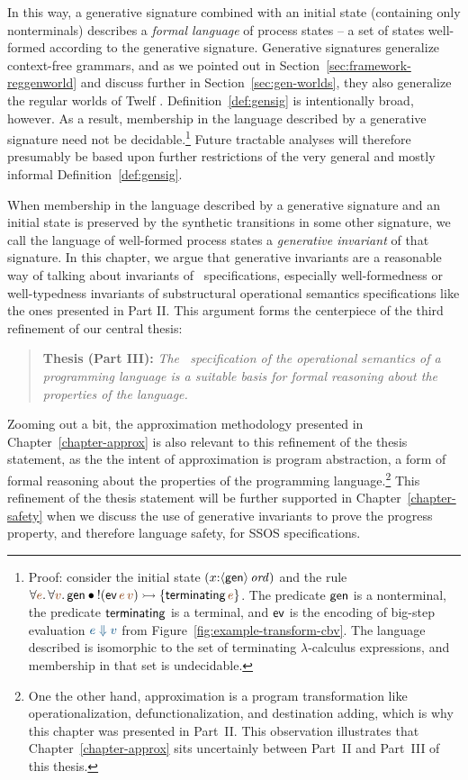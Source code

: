 In this way, a generative signature combined with an initial state
(containing only nonterminals) describes a {\it formal language} of
process states -- a set of states well-formed according to the
generative signature. Generative signatures generalize context-free
grammars, and as we pointed out in
Section~\ref{sec:framework-reggenworld} and discuss further in
Section~\ref{sec:gen-worlds}, they also generalize the regular worlds
of Twelf \cite{schurmann00automating}. Definition~\ref{def:gensig} is
intentionally broad, however. As a result, membership in the language
described by a generative signature need not be
decidable.\footnote{Proof: consider the initial state
  $(x{:}{\langle {\sf gen} \rangle}\,{{\it ord}})$ and the rule $\forall
  \lf{e}.\,\forall\lf{v}.\,{\sf gen} \fuse {!}({\sf
    ev}\,\lf{e}\,\lf{v}) \lefti \{ {\sf terminating}\,\lf{e} \}$. The
  predicate ${\sf gen}$ is a nonterminal, the predicate ${\sf
    terminating}$ is a terminal, and ${\sf ev}$ is the encoding of
  big-step evaluation $\obj{e \Downarrow v}$ from
  Figure~\ref{fig:example-transform-cbv}.  The language described is
  isomorphic to the set of terminating $\lambda$-calculus expressions,
  and membership in that set is undecidable.} Future tractable analyses
will therefore presumably be based upon further restrictions of the
very general and mostly informal Definition~\ref{def:gensig}.

When membership in the language described by a generative signature
and an initial state is preserved by the synthetic transitions in some
other signature, we call the language of well-formed process states a
{\it generative invariant} of that signature.  In this chapter, we
argue that generative invariants are a reasonable way of talking about
invariants of \sls~specifications, especially well-formedness or
well-typedness invariants of substructural operational semantics
specifications like the ones presented in Part II. This argument forms
the centerpiece of the third refinement of our central thesis:

\smallskip
\begin{quote} 
  {\bf Thesis (Part III):} {\it The \sls~specification of the operational
    semantics of a programming language is a suitable basis for formal
    reasoning about the properties of the language.}
\end{quote} 
\smallskip 

\noindent
Zooming out a bit, the approximation methodology presented in
Chapter~\ref{chapter-approx} is also relevant to this refinement of
the thesis statement, as the the intent of approximation is program
abstraction, a form of formal reasoning about the properties of the
programming language.\footnote{One the other hand, approximation is a
  program transformation like operationalization, defunctionalization,
  and destination adding, which is why this chapter was presented in
  Part~II. This observation illustrates that
  Chapter~\ref{chapter-approx} sits uncertainly between Part~II and
  Part~III of this thesis.} This refinement of the thesis statement
will be further supported in Chapter~\ref{chapter-safety} when we
discuss the use of generative invariants to prove the progress
property, and therefore language safety, for SSOS specifications.

